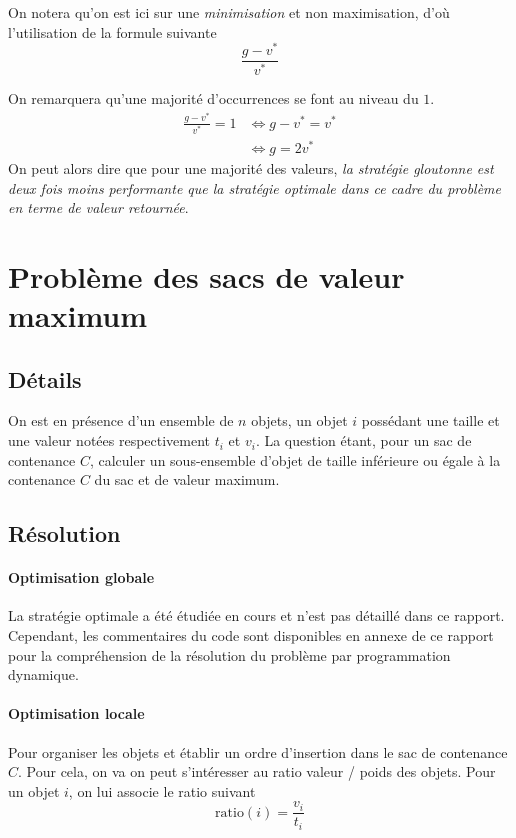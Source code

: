 \documentclass[a4paper,english,french]{article}
\begin{document}
On notera qu'on est ici sur une \textit{minimisation} et non {maximisation}, d'où l'utilisation de la formule suivante \[ \frac{g - v^*}{v^*} \]

On remarquera qu'une majorité d'occurrences se font au niveau du $1$.
%
\begin{align*}
\frac{g - v^*}{v^*} = 1 &\Leftrightarrow g - v^* = v^* \\
&\Leftrightarrow g = 2 v^*
\end{align*}
%
On peut alors dire que pour une majorité des valeurs, \textit{la stratégie gloutonne est deux fois moins performante que la stratégie optimale dans ce cadre du problème en terme de valeur retournée}.

\section{Problème des sacs de valeur maximum} \label{sec:bag}

\subsection*{Détails}

On est en présence d'un ensemble de $n$ objets, un objet $i$ possédant une taille et une valeur notées respectivement $t_i$ et $v_i$. La question étant, pour un sac de contenance $C$, calculer un sous-ensemble d'objet de taille inférieure ou égale à la contenance $C$ du sac et de valeur maximum.

\subsection*{Résolution}

\paragraph*{Optimisation globale} La stratégie optimale a été étudiée en cours et n'est pas détaillé dans ce rapport. Cependant, les commentaires du code sont disponibles en annexe de ce rapport pour la compréhension de la résolution du problème par programmation dynamique.

\paragraph*{Optimisation locale} Pour organiser les objets et établir un ordre d'insertion dans le sac de contenance $C$. Pour cela, on va on peut s'intéresser au ratio valeur / poids des objets. Pour un objet $i$, on lui associe le ratio suivant
\[ \text{ratio}(i) = \frac{v_i}{t_i} \]
\end{document}
